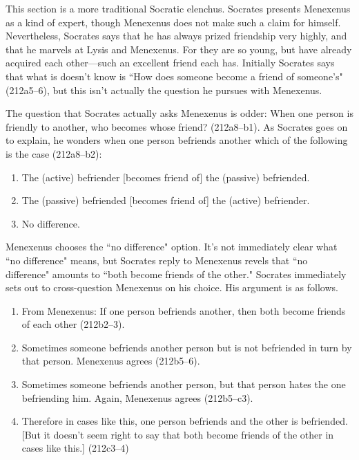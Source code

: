 \documentclass[11pt]{article}
\begin{document}
This section is a more traditional Socratic elenchus.  Socrates presents Menexenus as a kind of expert, though Menexenus does not make such a claim for himself.  Nevertheless, Socrates says that he has always prized friendship very highly, and that he marvels at Lysis and Menexenus. For they are so young, but have already acquired each other---such an excellent friend each has.  Initially Socrates says that what is doesn't know is ``How does someone become a friend of someone's" (212a5--6), but this isn't actually the question he pursues with Menexenus.

The question that Socrates actually asks Menexenus is odder: When one person is friendly to another, who becomes whose friend? (212a8--b1).  As Socrates goes on to explain, he wonders when one person befriends another which of the following is the case (212a8--b2):

\begin{enumerate}
    \item The (active) befriender [becomes friend of] the (passive) befriended.
    \item The (passive) befriended [becomes friend of] the (active) befriender.
    \item No difference.
\end{enumerate}

Menexenus chooses the ``no difference" option.  It's not immediately clear what ``no difference" means, but Socrates reply to Menexenus revels that ``no difference" amounts to ``both become friends of the other."  Socrates immediately sets out to cross-question Menexenus on his choice.  His argument is as follows.

\begin{enumerate}
    \item From Menexenus: If one person befriends another, then both become friends of each other (212b2--3).
    \item Sometimes someone befriends another person but is not befriended in turn by that person.  Menexenus agrees (212b5--6).
    \item Sometimes someone befriends another person, but that person hates the one befriending him.  Again, Menexenus agrees (212b5--c3).
    \item Therefore in cases like this, one person befriends and the other is befriended. [But it doesn't seem right to say that both become friends of the other in cases like this.] (212c3--4)
\end{enumerate}
\end{document}
